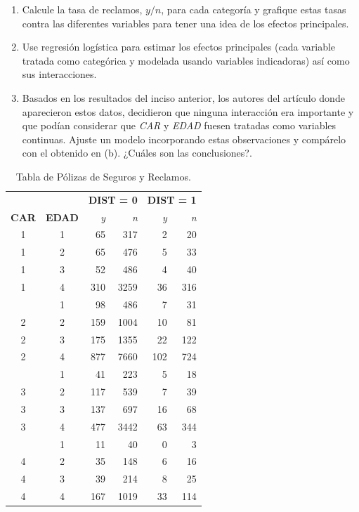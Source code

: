 \begin{enumerate}[label=\alph*.]
    \item Calcule la tasa de reclamos, $y/n$, para cada categoría y grafique estas tasas contra las diferentes variables para tener una idea de los efectos principales.
    
    \item Use regresión logística para estimar los efectos principales (cada variable tratada como categórica y modelada usando variables indicadoras) así como sus interacciones.
    
    \item Basados en los resultados del inciso anterior, los autores del artículo donde aparecieron estos datos, decidieron que ninguna interacción era importante y que podían considerar que \textit{CAR} y \textit{EDAD} fuesen tratadas como variables continuas. Ajuste un modelo incorporando estas observaciones y compárelo con el obtenido en (b). ¿Cuáles son las conclusiones?.
\end{enumerate}

\begin{table}[h!]
\centering
\begin{tabular}{cc rrrr}
\toprule
& & \multicolumn{2}{c}{\textbf{DIST = 0}} & \multicolumn{2}{c}{\textbf{DIST = 1}} \\
\cmidrule(lr){3-4} \cmidrule(lr){5-6}
\textbf{CAR} & \textbf{EDAD} & \textit{y} & \textit{n} & \textit{y} & \textit{n} \\
\midrule
1 & 1 & 65 & 317 & 2 & 20 \\
1 & 2 & 65 & 476 & 5 & 33 \\
1 & 3 & 52 & 486 & 4 & 40 \\
1 & 4 & 310 & 3259 & 36 & 316 \\
\addlinespace %
2 & 1 & 98 & 486 & 7 & 31 \\
2 & 2 & 159 & 1004 & 10 & 81 \\
2 & 3 & 175 & 1355 & 22 & 122 \\
2 & 4 & 877 & 7660 & 102 & 724 \\
\addlinespace
3 & 1 & 41 & 223 & 5 & 18 \\
3 & 2 & 117 & 539 & 7 & 39 \\
3 & 3 & 137 & 697 & 16 & 68 \\
3 & 4 & 477 & 3442 & 63 & 344 \\
\addlinespace
4 & 1 & 11 & 40 & 0 & 3 \\
4 & 2 & 35 & 148 & 6 & 16 \\
4 & 3 & 39 & 214 & 8 & 25 \\
4 & 4 & 167 & 1019 & 33 & 114 \\
\bottomrule
\end{tabular}
\caption{Tabla de Pólizas de Seguros y Reclamos.}
\label{tab:seguros}
\end{table}

